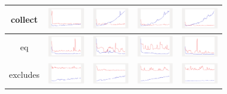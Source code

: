 \begin{longtable}{ c|c c c c}
collect
&
\includegraphics[width=1.6cm]{graphs/sequence/small/Collect} 
&
\includegraphics[width=1.6cm]{graphs/set/small/Collect}
&
\includegraphics[width=1.6cm]{graphs/bag/small/Collect}
&
\includegraphics[width=1.6cm]{graphs/orderedset/small/Collect}
\\\hline

eq
&
\includegraphics[width=1.6cm]{graphs/sequence/small/EQ}
&
\includegraphics[width=1.6cm]{graphs/set/small/EQ}
&
\includegraphics[width=1.6cm]{graphs/bag/small/EQ}
&
\includegraphics[width=1.6cm]{graphs/orderedset/small/EQ}
\\\hline

excludes
&
\includegraphics[width=1.6cm]{graphs/sequence/small/Excludes}
&
\includegraphics[width=1.6cm]{graphs/set/small/Excludes}
&
\includegraphics[width=1.6cm]{graphs/bag/small/Excludes}
&
\includegraphics[width=1.6cm]{graphs/orderedset/small/Excludes}
\\\hline


\end{longtable}
